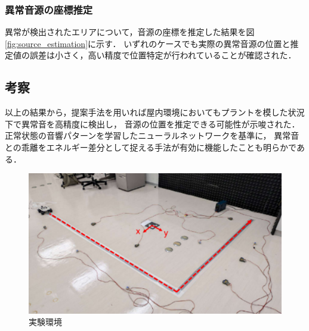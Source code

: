 \documentclass[../main]{subfiles}
\begin{document}
\subsubsection{異常音源の座標推定} \label{subsubsec:source_localization}

異常が検出されたエリアについて，音源の座標を推定した結果を図\ref{fig:source_estimation}に示す．
いずれのケースでも実際の異常音源の位置と推定値の誤差は小さく，高い精度で位置特定が行われていることが確認された．

\subsection{考察} \label{subsec:discussion}

以上の結果から，提案手法を用いれば屋内環境においてもプラントを模した状況下で異常音を高精度に検出し，
音源の位置を推定できる可能性が示唆された．
正常状態の音響パターンを学習したニューラルネットワークを基準に，
異常音との乖離をエネルギー差分として捉える手法が有効に機能したことも明らかである．
\label{subsec:vexp_ref_result}


\begin{figure}[t]
  \centering
  \includegraphics[keepaspectratio, width=1.0\linewidth]{chap4/env_experiment.png}
  \caption{実験環境}
  \label{fig:exp_setup}
\end{figure}
\end{document}
